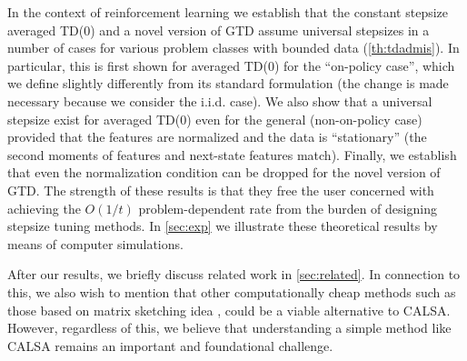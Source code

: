 \begin{enumerate}[topsep=0pt,itemsep=1pt,wide, labelwidth=!, labelindent=0pt,label=\emph{\arabic*}.]
In the context of reinforcement learning we establish that the constant stepsize averaged TD($0$) 
and a novel version of GTD assume universal stepsizes in a number of cases 
for various problem classes with bounded data (\cref{th:tdadmis}).
In particular, this is first shown for averaged TD($0$) for the ``on-policy case'', which we define
slightly differently from its standard formulation (the change is made necessary because we consider the i.i.d. case). 
We also show that a universal stepsize exist for averaged TD($0$) 
even for the general (non-on-policy case) provided that 
the features are normalized and the data is ``stationary'' (the second moments of features and next-state features match).
Finally, we establish that even the normalization condition can be dropped for the novel version of GTD. The strength of these results is that they free the user 
concerned with achieving the $O(1/t)$ problem-dependent rate from the burden of 
designing stepsize tuning methods.
In \cref{sec:exp} we illustrate these theoretical results by means of computer simulations.
\end{enumerate}%
After our results, we briefly discuss related work in \cref{sec:related}.
In connection to this, we also wish to mention
that other computationally cheap methods such as those based on matrix sketching idea \cite{woodruff2014sketching}, could be a viable alternative to  CALSA.  
However, regardless of this, we believe that understanding a simple method like CALSA remains an important and foundational challenge.

